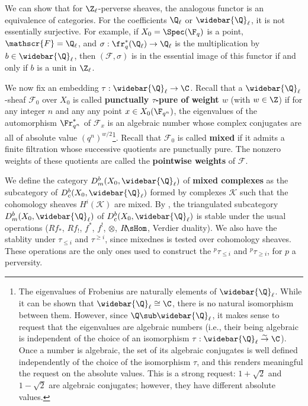 \begin{remark}
We can show that for $\Z_\ell$-perverse sheaves, the analogous functor is an equivalence of categories. For the coefficients $\Q_\ell$ or $\widebar{\Q}_\ell$, it is not essentially surjective. For example, if $X_0=\Spec(\F_q)$ is a point, $\mathscr{F}=\Q_\ell$, and $\sigma:\fr_q^*(\Q_\ell)\to\Q_\ell$ is the multiplication by $b\in\widebar{\Q}_\ell$, then $(\mathscr{F},\sigma)$ is in the essential image of this functor if and only if $b$ is a unit in $\Z_\ell$. 
\end{remark}

We now fix an embedding $\tau:\widebar{\Q}_\ell\to\C$. Recall \cite[1.2.1]{Deligne_WeilII} that a $\widebar{\Q}_\ell$-sheaf $\mathscr{F}_0$ over $X_0$ is called \textbf{punctually $\tau$-pure of weight $w$} (with $w\in\Z$) if for any integer $n$ and any any point $x\in X_0(\F_{q^n})$, the eigenvalues of the automorphism $\Fr_{q^n}^*$ of $\mathscr{F}_x$ is an algebraic number whose complex conjugates are all of absolute value $(q^n)^{w/2}$\footnote{The eigenvalues of Frobenius are naturally elements of $\widebar{\Q}_\ell$. While it can be shown that $\widebar{\Q}_\ell\cong\C$, there is no natural isomorphism between them. However, since $\Q\sub\widebar{\Q}_\ell$, it makes sense to request that the eigenvalues are algebraic numbers (i.e., their being algebraic is independent of the choice of an isomorphism $\tau:\widebar{\Q}_\ell\stackrel{\sim}{\to}\C$). Once a number is algebraic, the set of its algebraic conjugates is well defined independently of the choice of the isomorphism $\tau$, and this renders meaningful the request on the absolute values. This is a strong request: $1+\sqrt{2}$ and $1-\sqrt{2}$ are algebraic conjugates; however, they have different absolute values.}. Recall \cite[1.2.2]{Deligne_WeilII} that $\mathscr{F}_0$ is called \textbf{mixed} if it admits a finite filtration whose successive quotients are punctually pure. The nonzero weights of these quotients are called the \textbf{pointwise weights} of $\mathscr{F}$.\par

We define the category $D^b_m(X_0,\widebar{\Q}_\ell)$ of \textbf{mixed complexes} as the subcategory of $D^b_c(X_0,\widebar{\Q}_\ell)$ formed by complexes $\mathscr{K}$ such that the cohomology sheaves $H^i(\mathscr{K})$ are mixed. By \cite[I 6.1]{SGA4.5}, the triangulated subcategory $D^b_m(X_0,\widebar{\Q}_\ell)$ of $D^b_c(X_0,\widebar{\Q}_\ell)$ is stable under the usual operations ($Rf_*$, $Rf_!$, $f^*$, $f^!$, $\otimes$, $R\!\sHom$, Verdier duality). We also have the stablity under $\tau_{\leq i}$ and $\tau^{\geq i}$, since mixednes is tested over cohomology sheaves. These operations are the only ones used to construct the ${^p\!\tau_{\leq i}}$ and ${^p\!\tau_{\geq i}}$, for $p$ a perversity.

